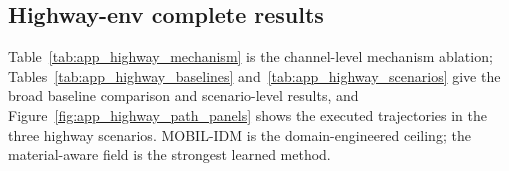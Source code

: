 \subsection{Highway-env complete results}
\label{app:highway_full}
Table~\ref{tab:app_highway_mechanism} is the channel-level mechanism ablation;
Tables~\ref{tab:app_highway_baselines} and~\ref{tab:app_highway_scenarios} give
the broad baseline comparison and scenario-level results, and
Figure~\ref{fig:app_highway_path_panels} shows the executed trajectories in the
three highway scenarios. MOBIL-IDM is the domain-engineered ceiling; the
material-aware field is the strongest learned method.

\begin{table}[htbp]
\centering
\caption{\textbf{Highway mechanism ablation} ($200$ paired seeds). Each row
removes or isolates one force channel, holding seeds and traffic fixed.
Columns group by scenario, covering default traffic (off-road rate), a slow leader
(collision rate, success rate), and boxed-in traffic where no lateral escape
exists (collision, off-road, mean speed). Arrows give the preferred direction.
The full channel set is needed to pass the lateral maneuver \emph{and} reject
it when the escape is removed; either channel alone fails one of the two.}
\label{tab:app_highway_mechanism}
\scriptsize\setlength{\tabcolsep}{3pt}\renewcommand{\arraystretch}{1.08}
\end{table}

